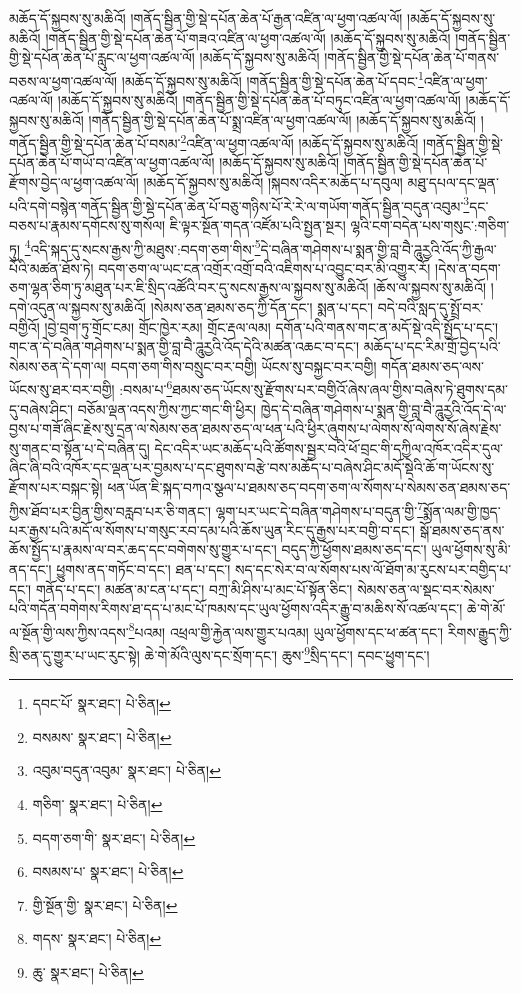 མཆོད་དོ་སྐྱབས་སུ་མཆིའོ། །གནོད་སྦྱིན་གྱི་སྡེ་དཔོན་ཆེན་པོ་རྒྱན་འཛིན་ལ་ཕྱག་འཚལ་ལོ། །མཆོད་དོ་སྐྱབས་སུ་མཆིའོ། །གནོད་སྦྱིན་གྱི་སྡེ་དཔོན་ཆེན་པོ་གཟའ་འཛིན་ལ་ཕྱག་འཚལ་ལོ། །མཆོད་དོ་སྐྱབས་སུ་མཆིའོ། །གནོད་སྦྱིན་གྱི་སྡེ་དཔོན་ཆེན་པོ་རླུང་ལ་ཕྱག་འཚལ་ལོ། །མཆོད་དོ་སྐྱབས་སུ་མཆིའོ། །གནོད་སྦྱིན་གྱི་སྡེ་དཔོན་ཆེན་པོ་གནས་བཅས་ལ་ཕྱག་འཚལ་ལོ། །མཆོད་དོ་སྐྱབས་སུ་མཆིའོ། །གནོད་སྦྱིན་གྱི་སྡེ་དཔོན་ཆེན་པོ་དབང་\footnote{དབང་པོ་  སྣར་ཐང་།  པེ་ཅིན། }འཛིན་ལ་ཕྱག་འཚལ་ལོ། །མཆོད་དོ་སྐྱབས་སུ་མཆིའོ། །གནོད་སྦྱིན་གྱི་སྡེ་དཔོན་ཆེན་པོ་བཏུང་འཛིན་ལ་ཕྱག་འཚལ་ལོ། །མཆོད་དོ་སྐྱབས་སུ་མཆིའོ། །གནོད་སྦྱིན་གྱི་སྡེ་དཔོན་ཆེན་པོ་སྨྲ་འཛིན་ལ་ཕྱག་འཚལ་ལོ། །མཆོད་དོ་སྐྱབས་སུ་མཆིའོ། །གནོད་སྦྱིན་གྱི་སྡེ་དཔོན་ཆེན་པོ་བསམ་\footnote{བསམས་  སྣར་ཐང་།  པེ་ཅིན། }འཛིན་ལ་ཕྱག་འཚལ་ལོ། །མཆོད་དོ་སྐྱབས་སུ་མཆིའོ། །གནོད་སྦྱིན་གྱི་སྡེ་དཔོན་ཆེན་པོ་གཡོ་བ་འཛིན་ལ་ཕྱག་འཚལ་ལོ། །མཆོད་དོ་སྐྱབས་སུ་མཆིའོ། །གནོད་སྦྱིན་གྱི་སྡེ་དཔོན་ཆེན་པོ་རྫོགས་བྱེད་ལ་ཕྱག་འཚལ་ལོ། །མཆོད་དོ་སྐྱབས་སུ་མཆིའོ། །སྐབས་འདིར་མཆོད་པ་དབུལ། མཐུ་དཔལ་དང་ལྡན་པའི་དགེ་བསྙེན་གནོད་སྦྱིན་གྱི་སྡེ་དཔོན་ཆེན་པོ་བཅུ་གཉིས་པོ་རེ་རེ་ལ་གཡོག་གནོད་སྦྱིན་བདུན་འབུམ་\footnote{འབུམ་བདུན་འབུམ་  སྣར་ཐང་།  པེ་ཅིན། }དང་བཅས་པ་རྣམས་དགོངས་སུ་གསོལ། ཇི་ལྟར་སྔོན་གདན་འཛོམ་པའི་སྤྱན་སྔར། ལྷའི་ངག་བདེན་པས་གསུང་:གཅིག་ཏུ། \footnote{གཅིག་  སྣར་ཐང་།  པེ་ཅིན། }འདི་སྐད་དུ་སངས་རྒྱས་ཀྱི་མཐུས་:བདག་ཅག་གིས་\footnote{བདག་ཅག་གི་  སྣར་ཐང་།  པེ་ཅིན། }དེ་བཞིན་གཤེགས་པ་སྨན་གྱི་བླ་བཻ་ཌཱུརྱའི་འོད་ཀྱི་རྒྱལ་པོའི་མཚན་ཐོས་ཏེ། བདག་ཅག་ལ་ཡང་ངན་འགྲོར་འགྲོ་བའི་འཇིགས་པ་འབྱུང་བར་མི་འགྱུར་རོ། །དེས་ན་བདག་ཅག་ལྷན་ཅིག་ཏུ་མཐུན་པར་ཇི་སྲིད་འཚོའི་བར་དུ་སངས་རྒྱས་ལ་སྐྱབས་སུ་མཆིའོ། །ཆོས་ལ་སྐྱབས་སུ་མཆིའོ། །དགེ་འདུན་ལ་སྐྱབས་སུ་མཆིའོ། །སེམས་ཅན་ཐམས་ཅད་ཀྱི་དོན་དང་། སྨན་པ་དང་། བདེ་བའི་སླད་དུ་སྤྲོ་བར་བགྱིའོ། །བྱེ་བྲག་ཏུ་གྲོང་ངམ། གྲོང་ཁྱེར་རམ། གྲོང་རྡལ་ལམ། དགོན་པའི་གནས་གང་ན་མདོ་སྡེ་འདི་སྤྱོད་པ་དང་། གང་ན་དེ་བཞིན་གཤེགས་པ་སྨན་གྱི་བླ་བཻ་ཌཱུརྱའི་འོད་དེའི་མཚན་འཆང་བ་དང་། མཆོད་པ་དང་རིམ་གྲོ་བྱེད་པའི་སེམས་ཅན་དེ་དག་ལ། བདག་ཅག་གིས་བསྲུང་བར་བགྱི། ཡོངས་སུ་བསྐྱང་བར་བགྱི། གདོན་ཐམས་ཅད་ལས་ཡོངས་སུ་ཐར་བར་བགྱི། :བསམ་པ་\footnote{བསམས་པ་  སྣར་ཐང་།  པེ་ཅིན། }ཐམས་ཅད་ཡོངས་སུ་རྫོགས་པར་བགྱིའོ་ཞེས་ཞལ་གྱིས་བཞེས་ཏེ་ཐུགས་དམ་དུ་བཞེས་ཤིང་། བཅོམ་ལྡན་འདས་ཀྱིས་ཀྱང་གང་གི་ཕྱིར། ཁྱེད་དེ་བཞིན་གཤེགས་པ་སྨན་གྱི་བླ་བཻ་ཌཱུརྱའི་འོད་དེ་ལ་བྱས་པ་གཟོ་ཞིང་རྗེས་སུ་དྲན་ལ་སེམས་ཅན་ཐམས་ཅད་ལ་ཕན་པའི་ཕྱིར་ཞུགས་པ་ལེགས་སོ་ལེགས་སོ་ཞེས་རྗེས་སུ་གནང་བ་སྟོན་པ་དེ་བཞིན་དུ། དེང་འདིར་ཡང་མཆོད་པའི་ཚོགས་སྦྱར་བའི་ཕོ་བྲང་གི་དཀྱིལ་འཁོར་འདིར་དུལ་ཞིང་ཞི་བའི་འཁོར་དང་ལྡན་པར་བྱམས་པ་དང་ཐུགས་བརྩེ་བས་མཆོད་པ་བཞེས་ཤིང་མདོ་སྡེའི་ཆོ་ག་ཡོངས་སུ་རྫོགས་པར་བསྐང་སྟེ། ཕན་ཡོན་ཇི་སྐད་བཀའ་སྩལ་པ་ཐམས་ཅད་བདག་ཅག་ལ་སོགས་པ་སེམས་ཅན་ཐམས་ཅད་ཀྱིས་ཐོབ་པར་བྱིན་གྱིས་བརླབ་པར་ཅི་གནང་། ལྷག་པར་ཡང་དེ་བཞིན་གཤེགས་པ་བདུན་གྱི་\footnote{གྱི་སྔོན་གྱི་  སྣར་ཐང་།  པེ་ཅིན། }སྨོན་ལམ་གྱི་ཁྱད་པར་རྒྱས་པའི་མདོ་ལ་སོགས་པ་གསུང་རབ་དམ་པའི་ཆོས་ཡུན་རིང་དུ་རྒྱས་པར་བགྱི་བ་དང་། སྒོ་ཐམས་ཅད་ནས་ཆོས་སྤྱོད་པ་རྣམས་ལ་བར་ཆད་དང་བགེགས་སུ་གྱུར་པ་དང་། བདུད་ཀྱི་ཕྱོགས་ཐམས་ཅད་དང་། ཡུལ་ཕྱོགས་སུ་མི་ནད་དང་། ཕྱུགས་ནད་གཏོང་བ་དང་། ཐན་པ་དང་། སད་དང་སེར་བ་ལ་སོགས་པས་ལོ་ཐོག་མ་རུངས་པར་བགྱིད་པ་དང་། གནོད་པ་དང་། མཚན་མ་ངན་པ་དང་། བཀྲ་མི་ཤིས་པ་མང་པོ་སྟོན་ཅིང་། སེམས་ཅན་ལ་སྡང་བར་སེམས་པའི་གདོན་བགེགས་རིགས་ཐ་དད་པ་མང་པོ་ཁམས་དང་ཡུལ་ཕྱོགས་འདིར་རྒྱུ་བ་མཆིས་སོ་འཚལ་དང་། ཆེ་གེ་མོ་ལ་སྔོན་གྱི་ལས་ཀྱིས་འདས་\footnote{གདས་  སྣར་ཐང་།  པེ་ཅིན། }པའམ། འཕྲལ་གྱི་རྐྱེན་ལས་གྱུར་པའམ། ཡུལ་ཕྱོགས་དང་ཕ་ཚན་དང་། རིགས་རྒྱུད་ཀྱི་སྲི་ཅན་དུ་གྱུར་པ་ཡང་རུང་སྟེ། ཆེ་གེ་མོའི་ལུས་དང་སྲོག་དང་། ཆུས་\footnote{ཆུ་  སྣར་ཐང་།  པེ་ཅིན། }སྲིད་དང་། དབང་ཕྱུག་དང་། 